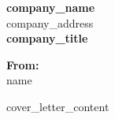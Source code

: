 \documentclass{article}
\begin{document}
\begin{center}
    \large
    \textbf{{{company_name}}} \\
    {{{company_address}}} \\
    \vspace{1em}
    \textbf{{{company_title}}} \\
\end{center}

\vspace{2em}

\noindent
\textbf{From:} \\
{{{name}}} \\
\vspace{1em}

\noindent
{{{cover_letter_content}}}
\end{document}

